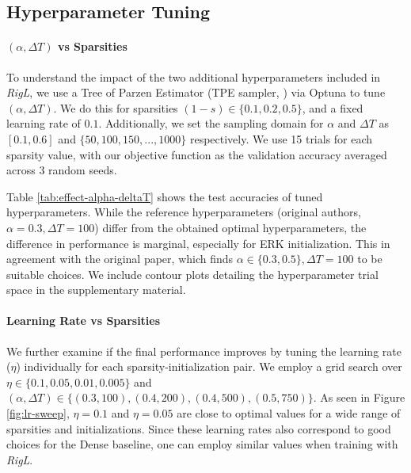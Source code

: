 \subsection{Hyperparameter Tuning}\label{hyperparameter-tuning}



\paragraph{$(\alpha, \Delta T)$ vs Sparsities} To understand the impact of the two additional hyperparameters included in \textit{RigL}, we use a Tree of Parzen Estimator (TPE sampler, \citet{TPE_Bergstra}) via Optuna to tune $(\alpha, \Delta T)$. We do this for sparsities $(1 - s) \in \{0.1,0.2,0.5\}$, and a fixed learning rate of $0.1$. Additionally, we set the sampling domain for $\alpha$ and $\Delta T$ as $[0.1,0.6]$ and $\{50,100, 150,...,1000\}$ respectively. We use 15 trials for each sparsity value, with our objective function as the validation accuracy averaged across 3 random seeds.



Table \ref{tab:effect-alpha-deltaT} shows the test accuracies of tuned hyperparameters. While the reference hyperparameters (original authors, $\alpha=0.3, \Delta T=100$) differ from the obtained optimal hyperparameters, the difference in performance is marginal, especially for ERK initialization. This in agreement with the original paper, which finds $\alpha \in \{0.3, 0.5\}, \Delta T = 100$ to be suitable choices. We include contour plots detailing the hyperparameter trial space in the supplementary material.

\paragraph{Learning Rate vs Sparsities} We further examine if the final performance improves by tuning the learning rate ($\eta$) individually for each sparsity-initialization pair. We employ a grid search over $\eta \in \{0.1,0.05,0.01,0.005\}$ and $(\alpha, \Delta T) \in \{(0.3, 100), (0.4,200), (0.4, 500), (0.5, 750)\}$. As seen in Figure \ref{fig:lr-sweep}, $\eta = 0.1$ and $\eta = 0.05$ are close to optimal values for a wide range of sparsities and initializations. Since these learning rates also correspond to good choices for the Dense baseline, one can employ similar values when training with \textit{RigL}.

